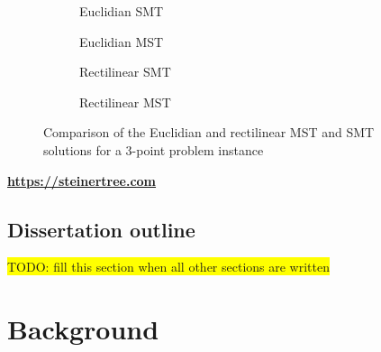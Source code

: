 \documentclass{l4proj}
\begin{document}
\begin{figure}[htb]
    \begin{subfigure}[b]{0.24\textwidth}
        \centering
        
        \caption{Euclidian SMT}
    \end{subfigure}
    \begin{subfigure}[b]{0.24\textwidth}
        \centering
        
        \caption{Euclidian MST}
    \end{subfigure}
    \begin{subfigure}[b]{0.24\textwidth}
        \centering
        
        \caption{Rectilinear SMT}
    \end{subfigure}
    \begin{subfigure}[b]{0.24\textwidth}
        \centering
        
        \caption{Rectilinear MST}
    \end{subfigure}

    \caption{Comparison of the Euclidian and rectilinear MST and SMT solutions for a 3-point problem instance}
    \label{fig:mst_rmst_3point}
\end{figure}

\begin{tcolorbox}[title=Access the end product here, colback=gray!10, colframe=gray!80]
    \centering
    \Huge{\textbf{\url{https://steinertree.com}}}
\end{tcolorbox}


\section{Dissertation outline}

\colorbox{yellow}{TODO: fill this section when all other sections are written}





\chapter{Background}
\end{document}
